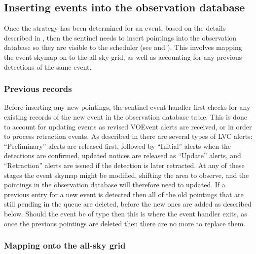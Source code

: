
\subsection{Inserting events into the observation database}
\label{sec:event_insert}
\begin{colsection}

Once the strategy has been determined for an event, based on the details described in , then the sentinel needs to insert pointings into the observation database so they are visible to the scheduler (see  and ). This involves mapping the event skymap on to the all-sky grid, as well as accounting for any previous detections of the same event.

\subsubsection{Previous records}

Before inserting any new pointings, the sentinel event handler first checks for any existing records of the new event in the observation database  table. This is done to account for updating events as revised VOEvent alerts are received, or in order to process retraction events. As described in  there are several types of LVC alerts: ``Preliminary'' alerts are released first, followed by ``Initial'' alerts when the detections are confirmed, updated notices are released as ``Update'' alerts, and ``Retraction'' alerts are issued if the detection is later retracted. At any of these stages the event skymap might be modified, shifting the area to observe, and the pointings in the observation database will therefore need to updated. If a previous entry for a new event is detected then all of the old pointings that are still pending in the queue are deleted, before the new ones are added as described below. Should the event be of type  then this is where the event handler exits, as once the previous pointings are deleted then there are no more to replace them.

\subsubsection{Mapping onto the all-sky grid}


\end{colsection}
